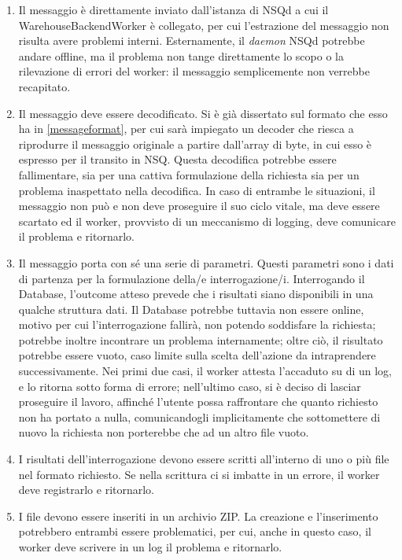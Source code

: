 \begin{enumerate}
    \item Il messaggio è direttamente inviato dall'istanza di NSQd a cui il WarehouseBackendWorker è collegato, per cui l'estrazione del messaggio non risulta avere problemi interni. Esternamente, il \textit{daemon} NSQd potrebbe andare offline, ma il problema non tange direttamente lo scopo o la rilevazione di errori del worker: il messaggio semplicemente non verrebbe recapitato.
    \item Il messaggio deve essere decodificato. Si è già dissertato sul formato che esso ha in \ref{messageformat}, per cui sarà impiegato un decoder che riesca a riprodurre il messaggio originale a partire dall'array di byte, in cui esso è espresso per il transito in NSQ. Questa decodifica potrebbe essere fallimentare, sia per una cattiva formulazione della richiesta sia per un problema inaspettato nella decodifica. In caso di entrambe le situazioni, il messaggio non può e non deve proseguire il suo ciclo vitale, ma deve essere scartato ed il worker, provvisto di un meccanismo di logging, deve comunicare il problema e ritornarlo.
    \item Il messaggio porta con sé una serie di parametri. Questi parametri sono i dati di partenza per la formulazione della/e interrogazione/i. Interrogando il Database, l'outcome atteso prevede che i risultati siano disponibili in una qualche struttura dati. Il Database potrebbe tuttavia non essere online, motivo per cui l'interrogazione fallirà, non potendo soddisfare la richiesta; potrebbe inoltre incontrare un problema internamente; oltre ciò, il risultato potrebbe essere vuoto, caso limite sulla scelta dell'azione da intraprendere successivamente. Nei primi due casi, il worker attesta l'accaduto su di un log, e lo ritorna sotto forma di errore; nell'ultimo caso, si è deciso di lasciar proseguire il lavoro, affinché l'utente possa raffrontare che quanto richiesto non ha portato a nulla, comunicandogli implicitamente che sottomettere di nuovo la richiesta non porterebbe che ad un altro file vuoto.
    \item I risultati dell'interrogazione devono essere scritti all'interno di uno o più file nel formato richiesto. Se nella scrittura ci si imbatte in un errore, il worker deve registrarlo e ritornarlo.
    \item I file devono essere inseriti in un archivio ZIP. La creazione e l'inserimento potrebbero entrambi essere problematici, per cui, anche in questo caso, il worker deve scrivere in un log il problema e ritornarlo.

\end{enumerate}
